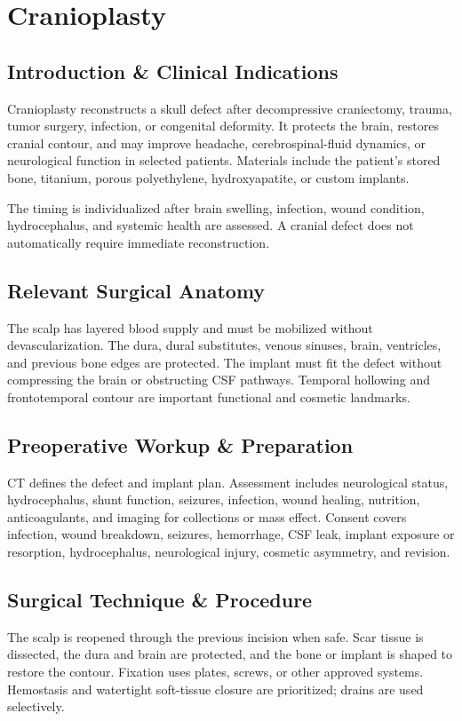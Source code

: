 \chapter{Cranioplasty}

\section*{Introduction \& Clinical Indications}
Cranioplasty reconstructs a skull defect after decompressive craniectomy, trauma, tumor surgery, infection, or congenital deformity. It protects the brain, restores cranial contour, and may improve headache, cerebrospinal-fluid dynamics, or neurological function in selected patients. Materials include the patient's stored bone, titanium, porous polyethylene, hydroxyapatite, or custom implants.

The timing is individualized after brain swelling, infection, wound condition, hydrocephalus, and systemic health are assessed. A cranial defect does not automatically require immediate reconstruction.

\section*{Relevant Surgical Anatomy}
The scalp has layered blood supply and must be mobilized without devascularization. The dura, dural substitutes, venous sinuses, brain, ventricles, and previous bone edges are protected. The implant must fit the defect without compressing the brain or obstructing CSF pathways. Temporal hollowing and frontotemporal contour are important functional and cosmetic landmarks.

\section*{Preoperative Workup \& Preparation}
CT defines the defect and implant plan. Assessment includes neurological status, hydrocephalus, shunt function, seizures, infection, wound healing, nutrition, anticoagulants, and imaging for collections or mass effect. Consent covers infection, wound breakdown, seizures, hemorrhage, CSF leak, implant exposure or resorption, hydrocephalus, neurological injury, cosmetic asymmetry, and revision.

\section*{Surgical Technique \& Procedure}
The scalp is reopened through the previous incision when safe. Scar tissue is dissected, the dura and brain are protected, and the bone or implant is shaped to restore the contour. Fixation uses plates, screws, or other approved systems. Hemostasis and watertight soft-tissue closure are prioritized; drains are used selectively.

